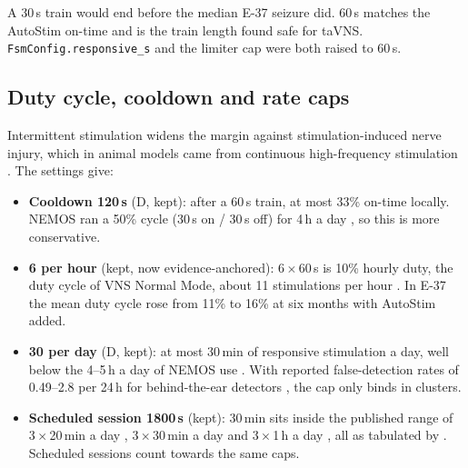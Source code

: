 \documentclass[10pt,a4paper]{article}
\newcommand{\code}[1]{\texttt{\small #1}}
\newcommand{\lvl}[1]{\textsf{\small #1}}
\begin{document}
A 30\,s train would end before the median E-37 seizure did. 60\,s matches the AutoStim on-time and is the train length
\textcite{badran2018} found safe for taVNS. \code{FsmConfig.responsive\_s} and the limiter cap were both raised to 60\,s.

\subsection{Duty cycle, cooldown and rate caps}\label{sec:duty}
Intermittent stimulation widens the margin against stimulation-induced nerve injury, which in animal models came from
continuous high-frequency stimulation \parencite{agnew1990}. The settings give:
\begin{itemize}
  \item \textbf{Cooldown 120\,s} (\lvl{D}, kept): after a 60\,s train, at most 33\% on-time locally. NEMOS ran a
        50\% cycle (30\,s on / 30\,s off) for 4\,h a day \parencite[Table 2]{yap2020}, so this is more conservative.
  \item \textbf{6 per hour} (kept, now evidence-anchored): $6\times60$\,s is 10\% hourly duty, the duty cycle of VNS
        Normal Mode, about 11 stimulations per hour \parencite{fisher2016}. In E-37 the mean duty cycle rose from 11\% to 16\% at six
        months with AutoStim added.
  \item \textbf{30 per day} (\lvl{D}, kept): at most 30\,min of responsive stimulation a day, well below the 4--5\,h a
        day of NEMOS use \parencite{yap2020}. With reported false-detection rates of 0.49--2.8 per 24\,h for
        behind-the-ear detectors \parencite{vandecasteele2020}, the cap only binds in clusters.
  \item \textbf{Scheduled session 1800\,s} (kept): 30\,min sits inside the published range of 3\,$\times$\,20\,min a
        day \parencite{aihua2014}, 3\,$\times$\,30\,min a day \parencite{he2013} and 3\,$\times$\,1\,h a day
        \parencite{stefan2012}, all as tabulated by \textcite{yap2020}. Scheduled sessions count towards the same
        caps.
\end{itemize}
\end{document}
